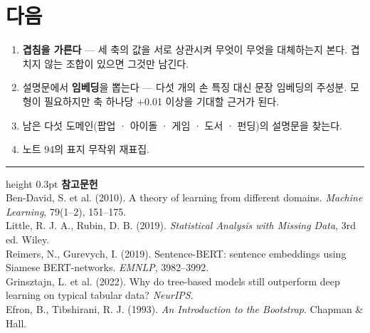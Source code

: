 \documentclass[10pt]{article}
\begin{document}
\section{다음}

\begin{enumerate}[leftmargin=1.3em,itemsep=0.15em]
\item \textbf{겹침을 가른다} --- 세 축의 값을 서로 상관시켜 무엇이 무엇을
      대체하는지 본다. 겹치지 않는 조합이 있으면 그것만 남긴다.
\item 설명문에서 \textbf{임베딩}을 뽑는다 --- 다섯 개의 손 특징 대신 문장
      임베딩의 주성분. 모형이 필요하지만 축 하나당 $+$0.01 이상을 기대할 근거가
      된다.
\item 남은 다섯 도메인(팝업 · 아이돌 · 게임 · 도서 · 펀딩)의 설명문을 찾는다.
\item 노트 94의 표지 무작위 재표집.
\end{enumerate}

\vspace{0.6em}
\hrule height 0.3pt
\vspace{0.5em}
{\footnotesize
\textbf{참고문헌}\\[0.3em]
Ben-David, S. et al. (2010). A theory of learning from different domains.
\emph{Machine Learning}, 79(1--2), 151--175.\\[0.15em]
Little, R. J. A., Rubin, D. B. (2019). \emph{Statistical Analysis with Missing
Data}, 3rd ed. Wiley.\\[0.15em]
Reimers, N., Gurevych, I. (2019). Sentence-BERT: sentence embeddings using
Siamese BERT-networks. \emph{EMNLP}, 3982--3992.\\[0.15em]
Grinsztajn, L. et al. (2022). Why do tree-based models still outperform deep
learning on typical tabular data? \emph{NeurIPS}.\\[0.15em]
Efron, B., Tibshirani, R. J. (1993). \emph{An Introduction to the Bootstrap}.
Chapman \& Hall.
}
\end{document}
